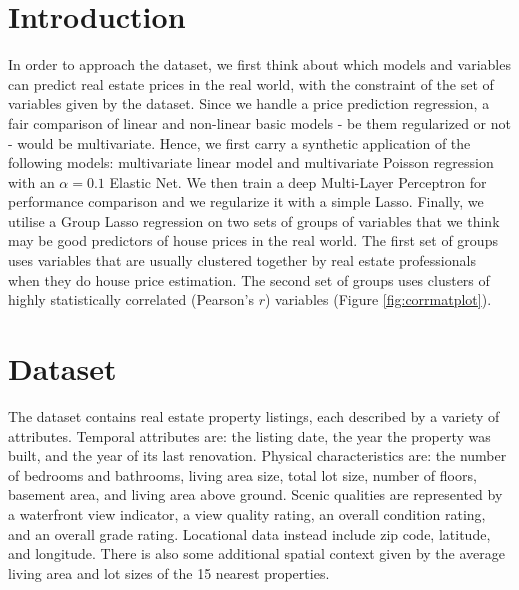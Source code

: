 \documentclass[a4paper, 12pt]{article}
\begin{document}
\begin{multicols}{2}

\section*{Introduction}
In order to approach the dataset, we first think about which models and variables can predict real estate prices in the real world, with the constraint of the set of variables given by the dataset. Since we handle a price prediction regression, a fair comparison of linear and non-linear basic models - be them regularized or not - would be multivariate. Hence, we first carry a synthetic application of the following models: multivariate linear model and multivariate Poisson regression with an $\alpha = 0.1$ Elastic Net.
We then train a deep Multi-Layer Perceptron for performance comparison and we regularize it with a simple Lasso.
Finally, we utilise a Group Lasso regression on two sets of groups of variables that we think may be good predictors of house prices in the real world. The first set of groups uses variables that are usually clustered together by real estate professionals when they do house price estimation. The second set of groups uses clusters of highly statistically correlated (Pearson's $r$) variables (Figure \ref{fig:corrmatplot}).

\section{Dataset} \vspace{-7pt}
The dataset contains real estate property listings, each described by a variety of attributes. Temporal attributes are: the listing date, the year the property was built, and the year of its last renovation. Physical characteristics are: the number of bedrooms and bathrooms, living area size, total lot size, number of floors, basement area, and living area above ground. Scenic qualities are represented by a waterfront view indicator, a view quality rating, an overall condition rating, and an overall grade rating. Locational data instead include zip code,  latitude, and longitude. There is also some additional spatial context given by the average living area and lot sizes of the 15 nearest properties.


\end{multicols}
\end{document}

